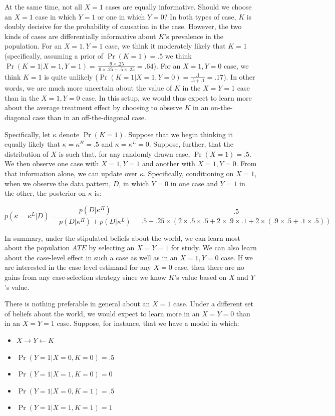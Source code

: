 \documentclass[
  12pt,
]{book}
\providecommand{\tightlist}{%
  \setlength{\itemsep}{0pt}\setlength{\parskip}{0pt}}
\begin{document}
At the same time, not all \(X=1\) cases are equally informative. Should we choose an \(X=1\) case in which \(Y=1\) or one in which \(Y=0\)? In both types of case, \(K\) is doubly decisive for the probability of causation in the case. However, the two kinds of cases are differentially informative about \(K\)'s prevalence in the population. For an \(X=1, Y=1\) case, we think it moderately likely that \(K=1\) (specifically, assuming a prior of \(\Pr(K=1)=.5\) we think \(\Pr(K=1 | X=1, Y=1) = \frac{.9 \times .25}{.9 \times .25+.5 \times.25}=.64\)). For an \(X=1, Y=0\) case, we think \(K=1\) is quite unlikely (\(\Pr(K=1 | X=1, Y=0) = \frac{.1}{.5+.1}=.17\)). In other words, we are much more uncertain about the value of \(K\) in the \(X=Y=1\) case than in the \(X=1, Y=0\) case. In this setup, we would thus expect to learn more about the average treatment effect by choosing to observe \(K\) in an on-the-diagonal case than in an off-the-diagonal case.

Specifically, let \(\kappa\) denote \(\Pr(K=1)\). Suppose that we begin thinking it equally likely that \(\kappa=\kappa^H = .5\) and \(\kappa=\kappa^L=0\). Suppose, further, that the distribution of \(X\) is such that, for any randomly drawn case, \(\Pr(X=1) = .5\). We then observe one case with \(X=1, Y=1\) and another with \(X=1, Y=0\). From that information alone, we can update over \(\kappa\). Specifically, conditioning on \(X=1\), when we observe the data pattern, \(D\), in which \(Y=0\) in one case and \(Y=1\) in the other, the posterior on \(\kappa\) is:

\[p(\kappa = \kappa^L|D) =  \frac{p(D|\kappa^H)}{p(D|\kappa^H)+p(D|\kappa^L)}=\frac{.5}{.5 + .25\times(2\times.5\times.5 + 2\times.9\times.1 + 2\times(.9\times.5 +.1\times.5))}\]

In summary, under the stipulated beliefs about the world, we can learn most about the population \(ATE\) by selecting an \(X=Y=1\) for study. We can also learn about the case-level effect in such a case as well as in an \(X=1, Y=0\) case. If we are interested in the case level estimand for any \(X=0\) case, then there are no gains from any case-selection strategy since we know \(K\)'s value based on \(X\) and \(Y\)'s value.

There is nothing preferable in general about an \(X=1\) case. Under a different set of beliefs about the world, we would expect to learn more in an \(X=Y=0\) than in an \(X=Y=1\) case. Suppose, for instance, that we have a model in which:

\begin{itemize}
\tightlist
\item
  \(X \rightarrow Y \leftarrow K\)
\item
  \(\Pr(Y=1|X=0, K = 0) = .5\)
\item
  \(\Pr(Y=1|X=1, K = 0) = 0\)
\item
  \(\Pr(Y=1|X=0, K = 1) = .5\)
\item
  \(\Pr(Y=1|X=1, K = 1) = 1\)
\end{itemize}
\end{document}
